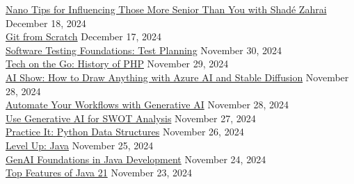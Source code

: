 \documentclass[10pt]{res} %
\begin{document}
\begin{resume}
\href{https://www.linkedin.com/learning/certificates/e167cdc5da3f9f1c638f9634e8cd86a04028275c0abb97eb9e1f84fb09d13a40}{\color{blue}Nano Tips for Influencing Those More Senior Than You with Shadé Zahrai} \hfill December 18, 2024 \\
\href{https://www.linkedin.com/learning/certificates/c3ef5252d19180ad841da2bbb9c3e8dfbce1f55eed40f7ef75915b69a2ca037a}{\color{blue}Git from Scratch} \hfill December 17, 2024 \\
\href{https://www.linkedin.com/learning/certificates/4784a8a5198c08cd126e7a99541cddf6e676c13e8005914321b497925d6eb7b3}{\color{blue}Software Testing Foundations: Test Planning} \hfill November 30, 2024 \\
\href{https://www.linkedin.com/learning/certificates/17e15e25a479ea126e8af692f1d25286fd7aad5d26bcefbccc545e5770cfc029}{\color{blue}Tech on the Go: History of PHP} \hfill November 29, 2024 \\
\href{https://www.linkedin.com/learning/certificates/44918298b0afaf1dd893ca78e98c4f2601bc89817fd5cef813bb1ef8f8d20f83}{\color{blue}AI Show: How to Draw Anything with Azure AI and Stable Diffusion} \hfill November 28, 2024 \\
\href{https://www.linkedin.com/learning/certificates/1d89acb02d4cce43e83a43d7be198b90a36362b1f24047f74aa048f615372e23}{\color{blue}Automate Your Workflows with Generative AI} \hfill November 28, 2024 \\
\href{https://www.linkedin.com/learning/certificates/a6e46a79ef45d1e8a370041bbebd3848b75469c59924edb7b0647d667247a48d}{\color{blue}Use Generative AI for SWOT Analysis} \hfill November 27, 2024 \\
\href{https://www.linkedin.com/learning/certificates/4f4a9d91efa3fbd62349ca546dc73e8e5a2bdd542c05492342e3794dd7e30ac6}{\color{blue}Practice It: Python Data Structures} \hfill November 26, 2024 \\
\href{https://www.linkedin.com/learning/certificates/93f0d471b79b97e7a4308a4d8c66d9428ec8ad57dc50c9654ea2f571737ed6bc}{\color{blue}Level Up: Java} \hfill November 25, 2024 \\
\href{https://www.linkedin.com/learning/certificates/e5d45d33d84e16485ef89428e1377705f5dd53bff8472c5cf26c6ee27a089ca9}{\color{blue}GenAI Foundations in Java Development} \hfill November 24, 2024 \\
\href{https://www.linkedin.com/learning/certificates/7b4b6ceb11ad4238066147e5262595673ad50673bc5453acf70d50935797e64a}{\color{blue}Top Features of Java 21} \hfill November 23, 2024 \\

\end{resume}
\end{document}
